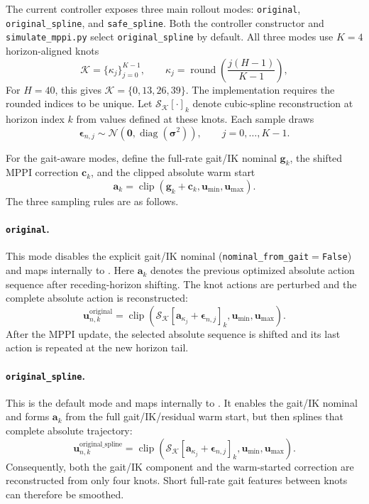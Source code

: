 \documentclass[11pt,a4paper]{article}
\newcommand{\clip}{\operatorname{clip}}
\newcommand{\diag}{\operatorname{diag}}
\newcommand{\code}[1]{\texttt{#1}}
\begin{document}
The current controller exposes three main rollout modes:
\code{original}, \code{original\_spline}, and \code{safe\_spline}. Both the
controller constructor and \code{simulate\_mppi.py} select
\code{original\_spline} by default. All three modes use $K=4$ horizon-aligned
knots
\begin{equation}
  \mathcal{K}=\{\kappa_j\}_{j=0}^{K-1},
  \qquad
  \kappa_j=
  \operatorname{round}\left(\frac{j(H-1)}{K-1}\right),
\end{equation}
For $H=40$, this gives $\mathcal{K}=\{0,13,26,39\}$. The implementation
requires the rounded indices to be unique. Let
$\mathcal{S}_{\mathcal{K}}[\cdot]_k$ denote cubic-spline reconstruction at
horizon index $k$ from values defined at these knots. Each sample draws
\begin{equation}
  \bm{\epsilon}_{n,j}
  \sim\mathcal{N}(\bm{0},\diag(\bm{\sigma}^2)),
  \qquad j=0,\ldots,K-1.
\end{equation}

For the gait-aware modes, define the full-rate gait/IK nominal
$\bm{g}_k$, the shifted MPPI correction $\bm{c}_k$, and the clipped absolute
warm start
\begin{equation}
  \bm{a}_k
  =\clip(\bm{g}_k+\bm{c}_k,\bm{u}_{\min},\bm{u}_{\max}).
\end{equation}
The three sampling rules are as follows.

\paragraph{\code{original}.}
This mode disables the explicit gait/IK nominal
(\code{nominal\_from\_gait}$=$\code{False}) and maps internally to
. Here $\bm{a}_k$ denotes the
previous optimized absolute action sequence after receding-horizon shifting.
The knot actions are perturbed and the complete absolute action is
reconstructed:
\begin{equation}
  \boxed{
  \bm{u}_{n,k}^{\mathrm{original}}
  =\clip\left(
    \mathcal{S}_{\mathcal{K}}
    [\bm{a}_{\kappa_j}+\bm{\epsilon}_{n,j}]_k,
    \bm{u}_{\min},\bm{u}_{\max}
  \right).
  }
\end{equation}
After the MPPI update, the selected absolute sequence is shifted and its last
action is repeated at the new horizon tail.

\paragraph{\code{original\_spline}.}
This is the default mode and maps internally to
. It enables the gait/IK nominal and
forms $\bm{a}_k$ from the full gait/IK/residual warm start, but then splines
that complete absolute trajectory:
\begin{equation}
  \boxed{
  \bm{u}_{n,k}^{\mathrm{original\_spline}}
  =\clip\left(
    \mathcal{S}_{\mathcal{K}}
    [\bm{a}_{\kappa_j}+\bm{\epsilon}_{n,j}]_k,
    \bm{u}_{\min},\bm{u}_{\max}
  \right).
  }
\end{equation}
Consequently, both the gait/IK component and the warm-started correction are
reconstructed from only four knots. Short full-rate gait features between
knots can therefore be smoothed.
\end{document}
